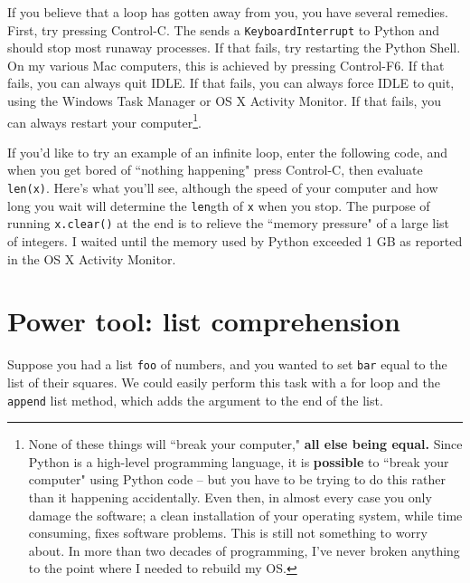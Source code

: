 \documentclass[m3380-lec-main.tex]{subfiles}
\begin{document}
If you believe that a loop has gotten away from you, you have several remedies. First, try pressing Control-C. The sends a \verb|KeyboardInterrupt| to Python and should stop most runaway processes. If that fails, try restarting the Python Shell. On my various Mac computers, this is achieved by pressing Control-F6. If that fails, you can always quit IDLE. If that fails, you can always force IDLE to quit, using the Windows Task Manager or OS X Activity Monitor. If that fails, you can always restart your computer\footnote{None of these things will ``break your computer," \textbf{all else being equal.} Since Python is a high-level programming language, it is \textbf{possible} to ``break your computer" using Python code -- but you have to be trying to do this rather than it happening accidentally. Even then, in almost every case you only damage the software; a clean installation of your operating system, while time consuming, fixes software problems. This is still not something to worry about. In more than two decades of programming, I've never broken anything to the point where I needed to rebuild my OS.}.

If you'd like to try an example of an infinite loop, enter the following code, and when you get bored of ``nothing happening" press Control-C, then evaluate \verb|len(x)|. Here's what you'll see, although the speed of your computer and how long you wait will determine the \verb|len|gth of \verb|x| when you stop. The purpose of running \verb|x.clear()| at the end is to relieve the ``memory pressure" of a large list of integers. I waited until the memory used by Python exceeded 1 GB as reported in the OS X Activity Monitor.\medskip


\noindent

\section{Power tool: list comprehension}
Suppose you had a list \verb|foo| of numbers, and you wanted to set \verb|bar| equal to the list of their squares. We could easily perform this task with a for loop and the \verb|append| list method, which adds the argument to the end of the list.
\end{document}
